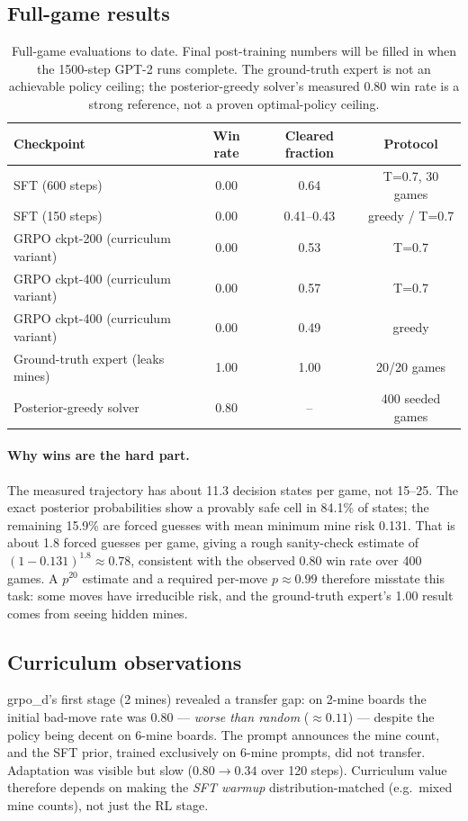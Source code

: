 \documentclass[11pt]{article}
\begin{document}
\subsection{Full-game results}
\begin{table}[H]
\centering
\small
\begin{tabular}{lccc}
\toprule
Checkpoint & Win rate & Cleared fraction & Protocol \\
\midrule
SFT (600 steps) & 0.00 & 0.64 & T=0.7, 30 games \\
SFT (150 steps) & 0.00 & 0.41--0.43 & greedy / T=0.7 \\
GRPO ckpt-200 (curriculum variant) & 0.00 & 0.53 & T=0.7 \\
GRPO ckpt-400 (curriculum variant) & 0.00 & 0.57 & T=0.7 \\
GRPO ckpt-400 (curriculum variant) & 0.00 & 0.49 & greedy \\
Ground-truth expert (leaks mines) & 1.00 & 1.00 & 20/20 games \\
Posterior-greedy solver & 0.80 & -- & 400 seeded games \\
\bottomrule
\end{tabular}
\caption{Full-game evaluations to date. Final post-training numbers will be
filled in when the 1500-step GPT-2 runs complete. The ground-truth expert is
not an achievable policy ceiling; the posterior-greedy solver's measured
0.80 win rate is a strong reference, not a proven optimal-policy ceiling.}
\end{table}

\paragraph{Why wins are the hard part.}
The measured trajectory has about 11.3 decision states per game, not 15--25.
The exact posterior probabilities show a provably safe cell in 84.1\% of states;
the remaining 15.9\% are forced guesses with mean minimum mine risk 0.131.
That is about 1.8 forced guesses per game, giving a rough sanity-check estimate of
$(1-0.131)^{1.8} \approx 0.78$, consistent with the observed 0.80 win rate
over 400 games. A $p^{20}$ estimate and a required per-move $p\approx0.99$
therefore misstate this task: some moves have irreducible risk, and the
ground-truth expert's 1.00 result comes from seeing hidden mines.

\subsection{Curriculum observations}
grpo\_d's first stage (2 mines) revealed a transfer gap: on 2-mine boards the
initial bad-move rate was $0.80$ --- \emph{worse than random} ($\approx
0.11$) --- despite the policy being decent on 6-mine boards. The prompt
announces the mine count, and the SFT prior, trained exclusively on 6-mine
prompts, did not transfer. Adaptation was visible but slow ($0.80 \to 0.34$
over 120 steps). Curriculum value therefore depends on making the
\emph{SFT warmup} distribution-matched (e.g.\ mixed mine counts), not just
the RL stage.
\end{document}
